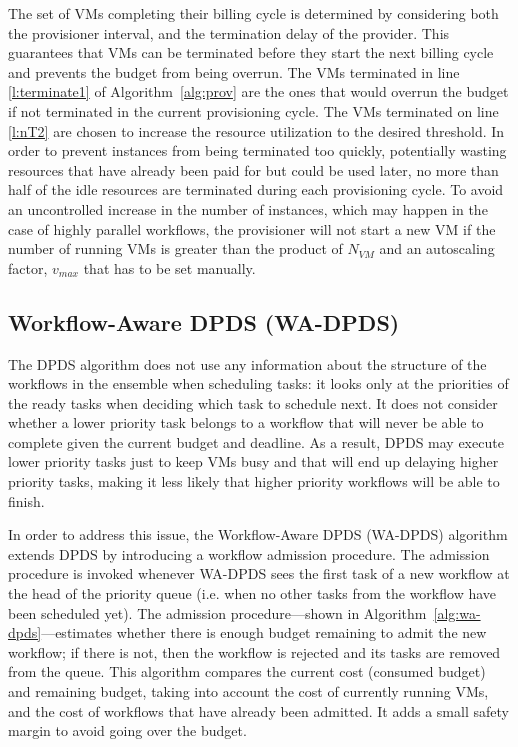 \documentclass{sig-alternate}
\begin{document}
The set of VMs completing their billing cycle is determined by considering both the
provisioner interval, and the termination delay of the provider. This guarantees 
that VMs can be terminated before they start the next billing cycle and prevents the
budget from being overrun. The VMs terminated in line \ref{l:terminate1} of Algorithm~\ref{alg:prov} are the ones 
that would overrun the budget if not terminated in the current provisioning cycle. 
The VMs terminated on line \ref{l:nT2} are chosen to increase the resource utilization
to the desired threshold. In order to prevent instances from being
terminated too quickly, potentially wasting resources that have already been paid for
but could be used later, no more than half of the idle resources are terminated during
each provisioning cycle. To avoid an uncontrolled increase in the number of
instances, which may happen in the case of highly parallel workflows, the provisioner 
will not start a new VM if the number of running VMs is greater than the product of
$N_{VM}$ and an autoscaling factor, $v_{max}$ that has to be set manually.


\subsection{Workflow-Aware DPDS (WA-DPDS)}

The DPDS algorithm does not use any information about the structure of the workflows
in the ensemble when scheduling tasks: it looks only at the priorities of the ready 
tasks when deciding which task to schedule next. It does not consider whether a lower 
priority task belongs to a workflow that will never be able to complete given the 
current budget and deadline. As a result, DPDS may execute lower priority tasks just 
to keep VMs busy and that will end up delaying higher priority tasks, making it less likely
that higher priority workflows will be able to finish.

In order to address this issue, the Workflow-Aware DPDS (WA-DPDS) algorithm extends 
DPDS by introducing a workflow admission procedure. The admission procedure is
invoked whenever WA-DPDS sees the first task of a new workflow at the head of the 
priority queue (i.e. when no other tasks from the workflow have been scheduled yet). 
The admission procedure---shown in Algorithm~\ref{alg:wa-dpds}---estimates whether there is 
enough budget remaining to admit the new workflow; if there is not, then the 
workflow is rejected and its tasks are removed from the queue. This algorithm 
compares the current cost (consumed budget) and remaining budget, taking
into account the cost of currently running VMs, and the cost of workflows 
that have already been admitted. It adds a small safety margin to  avoid going over
the budget.
\end{document}
